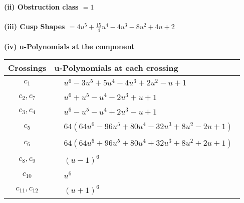 \documentclass[1p]{elsarticle_modified}
\theoremstyle{definition}
\begin{document}
\flushleft \textbf{(ii) Obstruction class $= 1$}\\~\\
\flushleft \textbf{(iii) Cusp Shapes $= 4 u^5+\frac{15}{4} u^4-4 u^3-8 u^2+4 u+2$}\\~\\
\newpage\renewcommand{\arraystretch}{1}
\flushleft \textbf{(iv) u-Polynomials at the component}\newline \\
\begin{tabular}{m{50pt}|m{274pt}}
Crossings & \hspace{64pt}u-Polynomials at each crossing \\
\hline $$\begin{aligned}c_{1}\end{aligned}$$&$\begin{aligned}
&u^6-3 u^5+5 u^4-4 u^3+2 u^2- u+1
\end{aligned}$\\
\hline $$\begin{aligned}c_{2},c_{7}\end{aligned}$$&$\begin{aligned}
&u^6+u^5- u^4-2 u^3+u+1
\end{aligned}$\\
\hline $$\begin{aligned}c_{3},c_{4}\end{aligned}$$&$\begin{aligned}
&u^6- u^5- u^4+2 u^3- u+1
\end{aligned}$\\
\hline $$\begin{aligned}c_{5}\end{aligned}$$&$\begin{aligned}
&64(64 u^6-96 u^5+80 u^4-32 u^3+8 u^2-2 u+1)
\end{aligned}$\\
\hline $$\begin{aligned}c_{6}\end{aligned}$$&$\begin{aligned}
&64(64 u^6+96 u^5+80 u^4+32 u^3+8 u^2+2 u+1)
\end{aligned}$\\
\hline $$\begin{aligned}c_{8},c_{9}\end{aligned}$$&$\begin{aligned}
&(u-1)^6
\end{aligned}$\\
\hline $$\begin{aligned}c_{10}\end{aligned}$$&$\begin{aligned}
&u^6
\end{aligned}$\\
\hline $$\begin{aligned}c_{11},c_{12}\end{aligned}$$&$\begin{aligned}
&(u+1)^6
\end{aligned}$\\
\hline
\end{tabular}\\~\\
\end{document}
